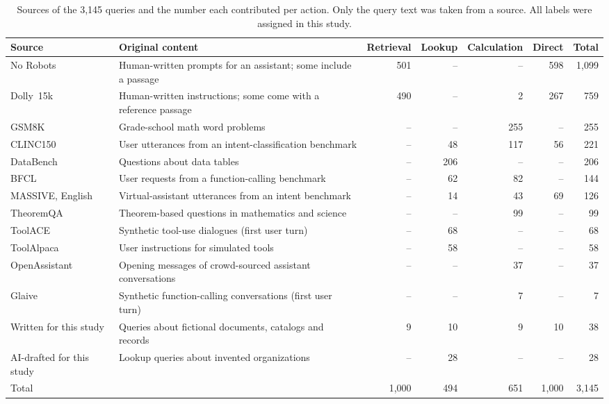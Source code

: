\documentclass[conference]{IEEEtran}
\begin{document}
\begin{table}[tbp]
\centering\caption{Sources of the 3,145 queries and the number each contributed per action. Only the query text was taken from a source. All labels were assigned in this study.}\label{tab:sources}
\setlength{\tabcolsep}{5pt}
\begin{tabular}{llrrrrr}\toprule
Source & Original content & Retrieval & Lookup & Calculation & Direct & Total\\ \midrule
No Robots~\cite{no-robots} & Human-written prompts for an assistant; some include a passage & 501 & -- & -- & 598 & 1,099\\
Dolly~15k~\cite{dolly-15k} & Human-written instructions; some come with a reference passage & 490 & -- & 2 & 267 & 759\\
GSM8K~\cite{gsm8k} & Grade-school math word problems & -- & -- & 255 & -- & 255\\
CLINC150~\cite{clinc150} & User utterances from an intent-classification benchmark & -- & 48 & 117 & 56 & 221\\
DataBench~\cite{databench} & Questions about data tables & -- & 206 & -- & -- & 206\\
BFCL~\cite{bfcl-v3} & User requests from a function-calling benchmark & -- & 62 & 82 & -- & 144\\
MASSIVE, English~\cite{massive-en-us,slurp} & Virtual-assistant utterances from an intent benchmark & -- & 14 & 43 & 69 & 126\\
TheoremQA~\cite{theoremqa} & Theorem-based questions in mathematics and science & -- & -- & 99 & -- & 99\\
ToolACE~\cite{toolace} & Synthetic tool-use dialogues (first user turn) & -- & 68 & -- & -- & 68\\
ToolAlpaca~\cite{toolalpaca} & User instructions for simulated tools & -- & 58 & -- & -- & 58\\
OpenAssistant~\cite{oasst2} & Opening messages of crowd-sourced assistant conversations & -- & -- & 37 & -- & 37\\
Glaive~\cite{glaive-fc-v2} & Synthetic function-calling conversations (first user turn) & -- & -- & 7 & -- & 7\\
Written for this study & Queries about fictional documents, catalogs and records & 9 & 10 & 9 & 10 & 38\\
AI-drafted for this study & Lookup queries about invented organizations & -- & 28 & -- & -- & 28\\ \midrule
Total & & 1,000 & 494 & 651 & 1,000 & 3,145\\ \bottomrule
\end{tabular}
\end{table}
\end{document}
